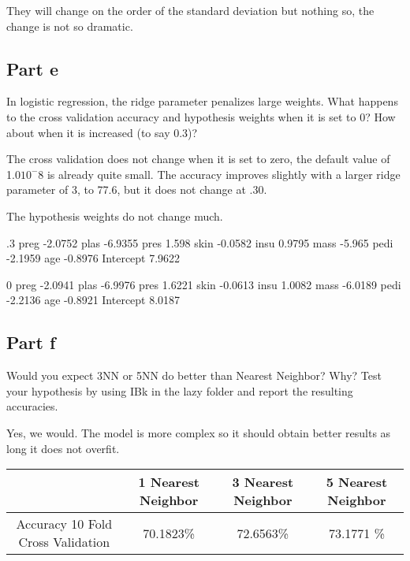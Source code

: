 \documentclass{article}
\begin{document}
They will change on the order of the standard deviation but nothing so, the change is not so dramatic. 

\subsection{Part e}
In logistic regression, the ridge parameter penalizes large weights. What happens to the cross validation accuracy and hypothesis weights when it is set to 0? How about when it is increased (to say 0.3)?

The cross validation does not change when it is set to zero, the default value of 1.0$10^-8$ is already quite small. The accuracy improves slightly with a larger ridge parameter of 3, to 77.6, but it does not change at .30. 

The hypothesis weights do not change  much. 

.3
preg                 -2.0752
plas                 -6.9355
pres                   1.598
skin                 -0.0582
insu                  0.9795
mass                  -5.965
pedi                 -2.1959
age                  -0.8976
Intercept             7.9622 

0 
preg                 -2.0941
plas                 -6.9976
pres                  1.6221
skin                 -0.0613
insu                  1.0082
mass                 -6.0189
pedi                 -2.2136
age                  -0.8921
Intercept             8.0187

\subsection{Part f}
Would you expect 3NN or 5NN do better than Nearest Neighbor? Why? Test your hypothesis by using IBk in the lazy folder and report the resulting accuracies.

Yes, we would. The model is more complex so it should obtain better results as long it does not overfit. 


\begin{table}[h]
    \begin{center}
    \begin{tabular}{|c|c|c|c|}
   \hline
        & 1 Nearest Neighbor & 3 Nearest Neighbor  & 5 Nearest Neighbor  \\ \hline
         Accuracy 10 Fold Cross Validation &  70.1823\%&72.6563\% &  73.1771 \%   \\ \hline
       
             
     
    \end{tabular}
    \end{center}
\end{table}
\end{document}

